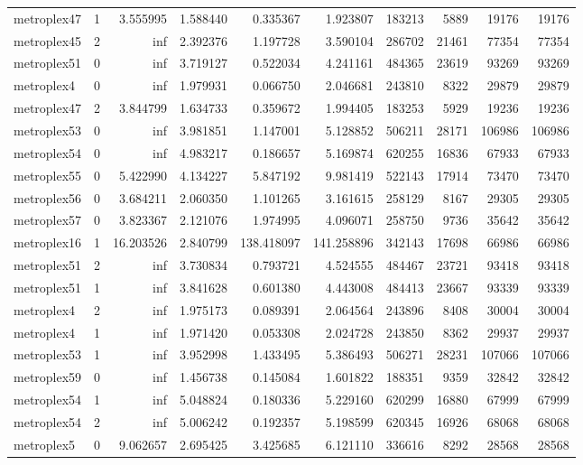 \begin{longtable}{|l|r|r|r|r|r|r|r|r|r|}
metroplex47 & 1 & 3.555995 & 1.588440 & 0.335367 & 1.923807 & 183213 & 5889 & 19176 & 19176 \\
metroplex45 & 2 & inf & 2.392376 & 1.197728 & 3.590104 & 286702 & 21461 & 77354 & 77354 \\
metroplex51 & 0 & inf & 3.719127 & 0.522034 & 4.241161 & 484365 & 23619 & 93269 & 93269 \\
metroplex4 & 0 & inf & 1.979931 & 0.066750 & 2.046681 & 243810 & 8322 & 29879 & 29879 \\
metroplex47 & 2 & 3.844799 & 1.634733 & 0.359672 & 1.994405 & 183253 & 5929 & 19236 & 19236 \\
metroplex53 & 0 & inf & 3.981851 & 1.147001 & 5.128852 & 506211 & 28171 & 106986 & 106986 \\
metroplex54 & 0 & inf & 4.983217 & 0.186657 & 5.169874 & 620255 & 16836 & 67933 & 67933 \\
metroplex55 & 0 & 5.422990 & 4.134227 & 5.847192 & 9.981419 & 522143 & 17914 & 73470 & 73470 \\
metroplex56 & 0 & 3.684211 & 2.060350 & 1.101265 & 3.161615 & 258129 & 8167 & 29305 & 29305 \\
metroplex57 & 0 & 3.823367 & 2.121076 & 1.974995 & 4.096071 & 258750 & 9736 & 35642 & 35642 \\
metroplex16 & 1 & 16.203526 & 2.840799 & 138.418097 & 141.258896 & 342143 & 17698 & 66986 & 66986 \\
metroplex51 & 2 & inf & 3.730834 & 0.793721 & 4.524555 & 484467 & 23721 & 93418 & 93418 \\
metroplex51 & 1 & inf & 3.841628 & 0.601380 & 4.443008 & 484413 & 23667 & 93339 & 93339 \\
metroplex4 & 2 & inf & 1.975173 & 0.089391 & 2.064564 & 243896 & 8408 & 30004 & 30004 \\
metroplex4 & 1 & inf & 1.971420 & 0.053308 & 2.024728 & 243850 & 8362 & 29937 & 29937 \\
metroplex53 & 1 & inf & 3.952998 & 1.433495 & 5.386493 & 506271 & 28231 & 107066 & 107066 \\
metroplex59 & 0 & inf & 1.456738 & 0.145084 & 1.601822 & 188351 & 9359 & 32842 & 32842 \\
metroplex54 & 1 & inf & 5.048824 & 0.180336 & 5.229160 & 620299 & 16880 & 67999 & 67999 \\
metroplex54 & 2 & inf & 5.006242 & 0.192357 & 5.198599 & 620345 & 16926 & 68068 & 68068 \\
metroplex5 & 0 & 9.062657 & 2.695425 & 3.425685 & 6.121110 & 336616 & 8292 & 28568 & 28568 \\

\end{longtable}
